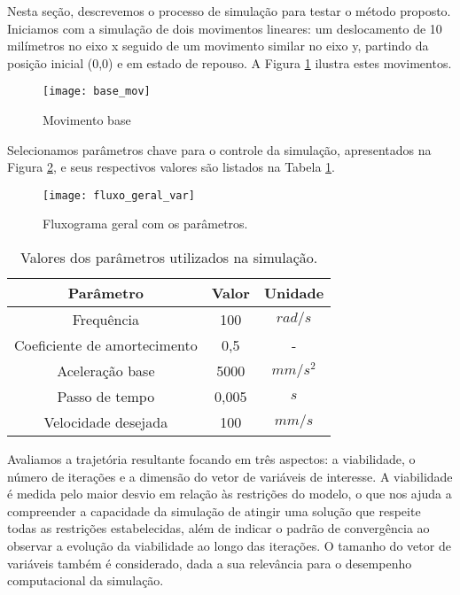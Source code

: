 Nesta seção, descrevemos o processo de simulação para testar o método proposto. Iniciamos com a simulação de dois movimentos lineares: um deslocamento de 10 milímetros no eixo x seguido de um movimento similar no eixo y, partindo da posição inicial (0,0) e em estado de repouso. A Figura \ref{fig:base_mov} ilustra estes movimentos.

\begin{figure}[H]
    \centering
    \caption{Movimento base}
    \texttt{[image: base\_mov]}

    \label{fig:base_mov}
\end{figure}

Selecionamos parâmetros chave para o controle da simulação, apresentados na Figura \ref{fig:fluxo_geral_var}, e seus respectivos valores são listados na Tabela \ref{tab:base_params}.

\begin{figure}[H]
    \centering
    \caption{Fluxograma geral com os parâmetros.}
    \texttt{[image: fluxo\_geral\_var]}

    \label{fig:fluxo_geral_var}
\end{figure}

\begin{table}
    \begin{center}
    \caption{Valores dos parâmetros utilizados na simulação.}
    \label{tab:base_params}
    \begin{tabular}{c c c}
        Parâmetro & Valor & Unidade\\ \hline
        Frequência & 100 & $rad/s$\\
        Coeficiente de amortecimento & 0,5 & - \\
        Aceleração base & 5000 & $mm/s^2$ \\
        Passo de tempo & 0,005 & $s$ \\ 
        Velocidade desejada & 100 & $mm/s$ \\ \hline
    \end{tabular}
    \end{center}
\end{table}

Avaliamos a trajetória resultante focando em três aspectos: a viabilidade, o número de iterações e a dimensão do vetor de variáveis de interesse. A viabilidade é medida pelo maior desvio em relação às restrições do modelo, o que nos ajuda a compreender a capacidade da simulação de atingir uma solução que respeite todas as restrições estabelecidas, além de indicar o padrão de convergência ao observar a evolução da viabilidade ao longo das iterações. O tamanho do vetor de variáveis também é considerado, dada a sua relevância para o desempenho computacional da simulação.

